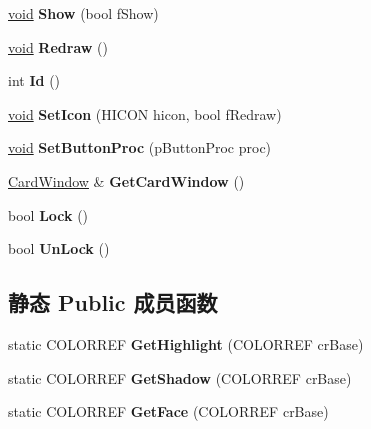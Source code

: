 \begin{DoxyCompactItemize}
\item 
\mbox{\label{class_card_button_a09f6a2982cf746b46fd3d7fb7d66ce5d}} 
\hyperlink{interfacevoid}{void} {\bfseries Show} (bool f\+Show)
\item 
\mbox{\label{class_card_button_a79a3eb4bde3992a8a5fd402b4aca5f6a}} 
\hyperlink{interfacevoid}{void} {\bfseries Redraw} ()
\item 
\mbox{\label{class_card_button_a777547752f42b5524f90929c17ec3439}} 
int {\bfseries Id} ()
\item 
\mbox{\label{class_card_button_a3da1e2ecd2adfd8e572524102d746016}} 
\hyperlink{interfacevoid}{void} {\bfseries Set\+Icon} (H\+I\+C\+ON hicon, bool f\+Redraw)
\item 
\mbox{\label{class_card_button_ac51534d2e027ecc9cf86222dad25bef7}} 
\hyperlink{interfacevoid}{void} {\bfseries Set\+Button\+Proc} (p\+Button\+Proc proc)
\item 
\mbox{\label{class_card_button_a2d8ec55658834f8cf5347b038dd890bf}} 
\hyperlink{class_card_window}{Card\+Window} \& {\bfseries Get\+Card\+Window} ()
\item 
\mbox{\label{class_card_button_a6cda496acbb804bfbbcf7aedc9a253ca}} 
bool {\bfseries Lock} ()
\item 
\mbox{\label{class_card_button_ae79924ec3bc3b6451ebd152a1098ea6e}} 
bool {\bfseries Un\+Lock} ()
\end{DoxyCompactItemize}
\subsection*{静态 Public 成员函数}
\begin{DoxyCompactItemize}
\item 
\mbox{\label{class_card_button_a30e3733d1615a5ebd6ad8e08ad43432a}} 
static C\+O\+L\+O\+R\+R\+EF {\bfseries Get\+Highlight} (C\+O\+L\+O\+R\+R\+EF cr\+Base)
\item 
\mbox{\label{class_card_button_a62f9d89ef9a37e7f05ac48ff7cad15e9}} 
static C\+O\+L\+O\+R\+R\+EF {\bfseries Get\+Shadow} (C\+O\+L\+O\+R\+R\+EF cr\+Base)
\item 
\mbox{\label{class_card_button_aa841b6da4447fdfae9efc627d751a46f}} 
static C\+O\+L\+O\+R\+R\+EF {\bfseries Get\+Face} (C\+O\+L\+O\+R\+R\+EF cr\+Base)
\end{DoxyCompactItemize}
